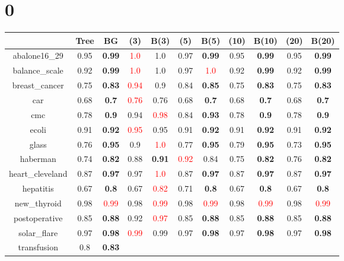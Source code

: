 \documentclass{article}%
\begin{document}
%
\normalsize%
\section*{0}%
\begin{tabular}{c|cccccccccc}%
\hline%
&Tree&BG&(3)&B(3)&(5)&B(5)&(10)&B(10)&(20)&B(20)\\%
\hline%
abalone16\_29&0.95&\textbf{0.99}&\textcolor{red}{ 
1.0
}&1.0&0.97&\textbf{0.99}&0.95&\textbf{0.99}&0.95&\textbf{0.99}\\%
\hline%
balance\_scale&0.92&\textbf{0.99}&\textcolor{red}{ 
1.0
}&1.0&0.97&\textcolor{red}{ 
1.0
}&0.92&\textbf{0.99}&0.92&\textbf{0.99}\\%
\hline%
breast\_cancer&0.75&\textbf{0.83}&\textcolor{red}{ 
0.94
}&0.9&0.84&\textbf{0.85}&0.75&\textbf{0.83}&0.75&\textbf{0.83}\\%
\hline%
car&0.68&\textbf{0.7}&\textcolor{red}{ 
0.76
}&0.76&0.68&\textbf{0.7}&0.68&\textbf{0.7}&0.68&\textbf{0.7}\\%
\hline%
cmc&0.78&\textbf{0.9}&0.94&\textcolor{red}{ 
0.98
}&0.84&\textbf{0.93}&0.78&\textbf{0.9}&0.78&\textbf{0.9}\\%
\hline%
ecoli&0.91&\textbf{0.92}&\textcolor{red}{ 
0.95
}&0.95&0.91&\textbf{0.92}&0.91&\textbf{0.92}&0.91&\textbf{0.92}\\%
\hline%
glass&0.76&\textbf{0.95}&0.9&\textcolor{red}{ 
1.0
}&0.77&\textbf{0.95}&0.79&\textbf{0.95}&0.73&\textbf{0.95}\\%
\hline%
haberman&0.74&\textbf{0.82}&0.88&\textbf{0.91}&\textcolor{red}{ 
0.92
}&0.84&0.75&\textbf{0.82}&0.76&\textbf{0.82}\\%
\hline%
heart\_cleveland&0.87&\textbf{0.97}&0.97&\textcolor{red}{ 
1.0
}&0.87&\textbf{0.97}&0.87&\textbf{0.97}&0.87&\textbf{0.97}\\%
\hline%
hepatitis&0.67&\textbf{0.8}&0.67&\textcolor{red}{ 
0.82
}&0.71&\textbf{0.8}&0.67&\textbf{0.8}&0.67&\textbf{0.8}\\%
\hline%
new\_thyroid&0.98&\textcolor{red}{ 
0.99
}&0.98&\textcolor{red}{ 
0.99
}&0.98&\textcolor{red}{ 
0.99
}&0.98&\textcolor{red}{ 
0.99
}&0.98&\textcolor{red}{ 
0.99
}\\%
\hline%
postoperative&0.85&\textbf{0.88}&0.92&\textcolor{red}{ 
0.97
}&0.85&\textbf{0.88}&0.85&\textbf{0.88}&0.85&\textbf{0.88}\\%
\hline%
solar\_flare&0.97&\textbf{0.98}&\textcolor{red}{ 
0.99
}&0.99&0.97&\textbf{0.98}&0.97&\textbf{0.98}&0.97&\textbf{0.98}\\%
\hline%
transfusion&0.8&\textbf{0.83}&\textcolor{red}{ 
}
\end{tabular}
\end{document}
